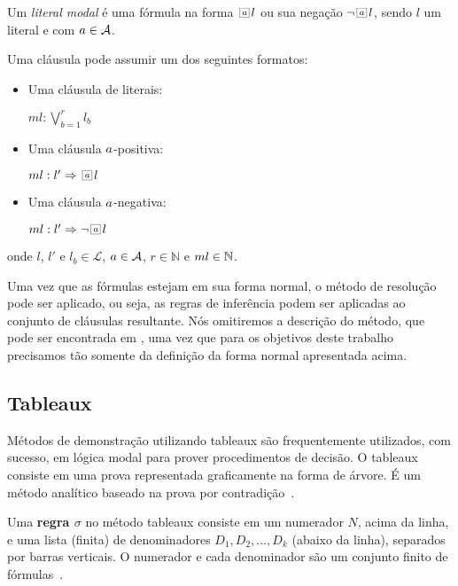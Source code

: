 \begin{definition} Um \textit{literal modal} é uma fórmula na forma
$\nec{\agent} l$ ou sua negação $\neg \nec{\agent} l$, sendo $l$ um literal e
com $a \in {\cal{A}}$.  \end{definition}

Uma cláusula pode assumir um dos seguintes formatos:

\begin{itemize} \item Uma cláusula de literais:

        \begin{center} $ml: \bigvee^r_{b=1} l_b$ \end{center} \item Uma cláusula
                $a$-positiva:

        \begin{center} $ml: l' \Rightarrow \nec{\agent} l$ \end{center} \item
                Uma cláusula $a$-negativa:

        \begin{center} $ml: l' \Rightarrow \neg \nec{\agent} l$ \end{center}
    \end{itemize} onde $l$, $l'$ e $l_b \in \mathcal{L}$, $a \in {\cal{A}}$,
    $r \in \mathbb{N}$ e $ml \in \mbox{$\mathbb N$}$.

Uma vez que as fórmulas estejam em sua forma normal, o método de resolução pode
ser aplicado, ou seja, as regras de inferência podem ser aplicadas ao conjunto
de cláusulas resultante. Nós omitiremos a descrição do método, que pode ser
encontrada em \cite{DBLP:conf/tableaux/NalonHD15}, uma vez que para os objetivos
deste trabalho precisamos tão somente da definição da forma normal apresentada
acima.

\subsection{Tableaux}
\label{sub:tableaux}
Métodos de demonstração utilizando tableaux são frequentemente utilizados, com
sucesso, em lógica modal para prover procedimentos de decisão. O tableaux
consiste em uma prova representada graficamente na forma de árvore. É um método
analítico baseado na prova por contradição~\cite{fit:tableaux}.

\begin{definition}
    Uma \textbf{regra $\sigma$} no método tableaux consiste em um numerador $N$,
    acima da linha, e uma lista (finita) de denominadores $D_1, D_2,
    \ldots, D_k$ (abaixo da linha), separados por barras verticais. O numerador e
    cada denominador são um conjunto finito de fórmulas~\cite{tableaux:def}.
\end{definition}
 
